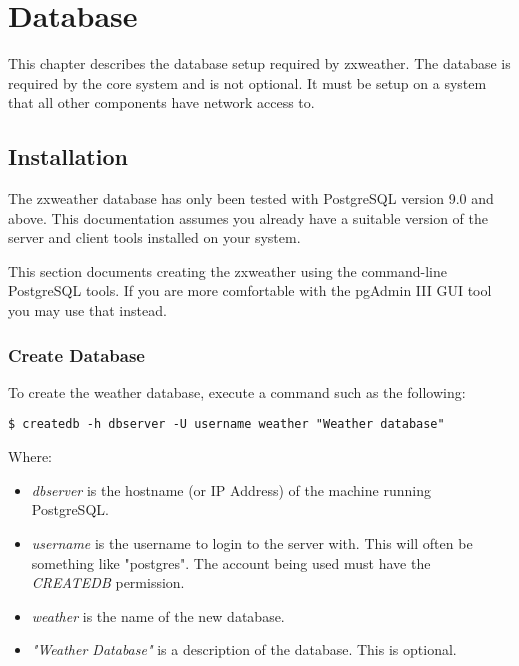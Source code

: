 \documentclass[a4paper,10pt,draft]{book}
\begin{document}
\chapter{Database}
\label{cha_database}

This chapter describes the database setup required by zxweather. The database is required by the core system and is not optional. It must be setup on a system that all other components have network access to.

\section{Installation}


The zxweather database has only been tested with PostgreSQL version 9.0 and above. This documentation assumes you already have a suitable version of the server and client tools installed on your system.

This section documents creating the zxweather using the command-line PostgreSQL tools. If you are more comfortable with the pgAdmin III GUI tool you may use that instead.

\subsection{Create Database}
To create the weather database, execute a command such as the following:

\begin{verbatim}
$ createdb -h dbserver -U username weather "Weather database"
\end{verbatim}

Where:
\begin{itemize}
\item \emph{dbserver} is the hostname (or IP Address) of the machine running PostgreSQL.
\item \emph{username} is the username to login to the server with. This will often be something like "postgres". The account being used must have the \emph{CREATEDB} permission.
\item \emph{weather} is the name of the new database.
\item \emph{"Weather Database"} is a description of the database. This is optional.
\end{itemize}
\end{document}

